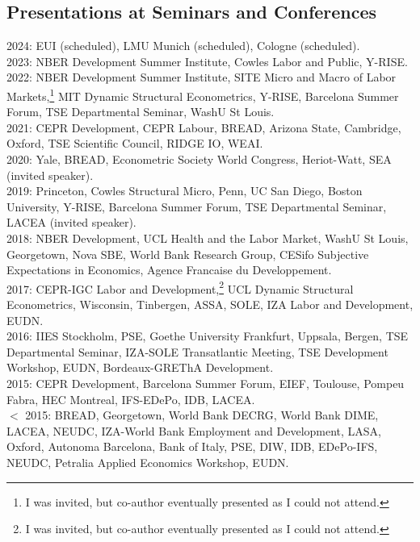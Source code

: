 \documentclass[12pt,english]{article}
\begin{document}
\subsection*{Presentations at Seminars and Conferences}
2024:  EUI (scheduled), LMU Munich (scheduled), Cologne (scheduled). \vspace{0.2cm} \\
2023: NBER Development Summer Institute, Cowles Labor and Public, Y-RISE.\vspace{0.2cm} \\
2022: NBER Development Summer Institute, SITE Micro and Macro of Labor Markets,\footnote{I was invited, but co-author eventually presented as I could not attend.} MIT Dynamic Structural Econometrics, Y-RISE, Barcelona Summer Forum, TSE Departmental Seminar, WashU St Louis.\vspace{0.2cm} \\
2021: CEPR Development, CEPR Labour, BREAD, Arizona State, Cambridge, Oxford, TSE Scientific Council, RIDGE IO, WEAI.\vspace{0.2cm} \\
2020: Yale, BREAD, Econometric Society World Congress, Heriot-Watt, SEA (invited speaker). \vspace{0.2cm} \\
2019: Princeton, Cowles Structural Micro, Penn, UC San Diego, Boston University, Y-RISE, Barcelona Summer Forum, TSE Departmental Seminar, LACEA (invited speaker).\vspace{0.2cm} \\
2018: NBER Development, UCL Health and the Labor Market, WashU St Louis, Georgetown, Nova SBE, World Bank Research Group, CESifo Subjective Expectations in Economics, Agence Francaise du Developpement. \vspace{0.2cm} \\
2017: CEPR-IGC Labor and Development,\footnote{I was invited, but co-author eventually presented as I could not attend.} UCL Dynamic Structural Econometrics, Wisconsin, Tinbergen, ASSA, SOLE, IZA Labor and Development, EUDN.\vspace{0.2cm} \\
2016: IIES Stockholm, PSE, Goethe University Frankfurt, Uppsala, Bergen, TSE Departmental Seminar, IZA-SOLE Transatlantic Meeting, TSE Development Workshop, EUDN, Bordeaux-GREThA Development.\vspace{0.2cm} \\
2015:  CEPR Development, Barcelona Summer Forum, EIEF, Toulouse, Pompeu Fabra, HEC Montreal, IFS-EDePo, IDB, LACEA.  \vspace{0.2cm} \\
$<$ 2015: BREAD, Georgetown, World Bank DECRG, World Bank DIME, LACEA, NEUDC, IZA-World Bank Employment and Development, LASA, Oxford, Autonoma Barcelona, Bank of Italy, PSE, DIW, IDB, EDePo-IFS, NEUDC, Petralia Applied Economics Workshop, EUDN.  
\end{document}
